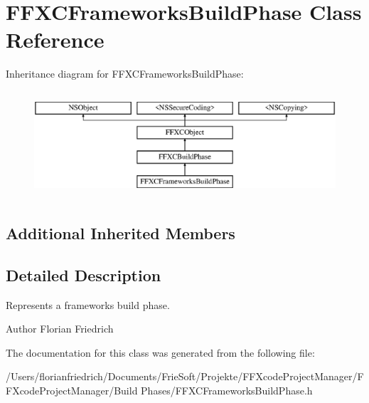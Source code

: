 \hypertarget{interface_f_f_x_c_frameworks_build_phase}{\section{F\-F\-X\-C\-Frameworks\-Build\-Phase Class Reference}
\label{interface_f_f_x_c_frameworks_build_phase}
}
Inheritance diagram for F\-F\-X\-C\-Frameworks\-Build\-Phase\-:\begin{figure}[H]
\begin{center}
\leavevmode
\includegraphics[height=4.000000cm]{interface_f_f_x_c_frameworks_build_phase}
\end{center}
\end{figure}
\subsection*{Additional Inherited Members}


\subsection{Detailed Description}
Represents a frameworks build phase. \begin{DoxyAuthor}{Author}
Florian Friedrich 
\end{DoxyAuthor}


The documentation for this class was generated from the following file\-:\begin{DoxyCompactItemize}
\item 
/\-Users/florianfriedrich/\-Documents/\-Frie\-Soft/\-Projekte/\-F\-F\-Xcode\-Project\-Manager/\-F\-F\-Xcode\-Project\-Manager/\-Build Phases/F\-F\-X\-C\-Frameworks\-Build\-Phase.\-h\end{DoxyCompactItemize}
